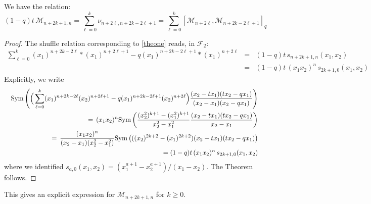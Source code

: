 \begin{thm}\label{oddMthm}
We have the relation:
\begin{equation}\label{theone}
(1-q)t \,{\mathcal M}_{n+2k+1,n}= \sum_{\ell=0}^k \nu_{n+2\ell,n+2k-2\ell+1}
=\sum_{\ell=0}^k \left[ {\mathcal M}_{n+2\ell},{\mathcal M}_{n+2k-2\ell+1}\right]_q 
\end{equation}
\end{thm}
\begin{proof}
The shuffle relation corresponding to \eqref{theone} reads, in ${\mathcal F}_2$:
\begin{eqnarray*}
\sum_{\ell=0}^k (x_1)^{n+2k-2\ell} * (x_1)^{n+2\ell+1}-q (x_1)^{n+2k-2\ell+1} * (x_1)^{n+2\ell}
&=&(1-q)t \,s_{n+2k+1,n}(x_1,x_2)\\
&=&(1-q)t\,  (x_1x_2)^n\, s_{2k+1,0}(x_1,x_2)
\end{eqnarray*}
Explicitly, we write
\begin{eqnarray*}
&&{\rm Sym}\left( \Big(\sum_{\ell=0}^k (x_1)^{n+2k-2\ell} (x_2)^{n+2\ell+1}-q (x_1)^{n+2k-2\ell+1} (x_2)^{n+2\ell}\Big)\frac{(x_2-t x_1)(t x_2-q x_1)}{(x_2-x_1)(x_2-q x_1)}\right) \\
&&\qquad =\, 
(x_1x_2)^n {\rm Sym}\left(\frac{(x_2^2)^{k+1}-(x_1^2)^{k+1}}{x_2^2-x_1^2} 
\frac{(x_2-t x_1)(t x_2-q  x_1)}{x_2-x_1}\right)\\
&&\qquad =\,\frac{(x_1x_2)^n}{(x_2-x_1)(x_2^2-x_1^2)} 
{\rm Sym}\left(((x_2)^{2k+2}-(x_1)^{2k+2})(x_2-t x_1)(t x_2-q  x_1)\right)\\
&&\qquad =(1-q)t \, (x_1x_2)^n\, s_{2k+1,0}(x_1,x_2)
\end{eqnarray*}
where we identified $s_{a,0}(x_1,x_2)=(x_1^{a+1}-x_2^{a+1})/(x_1-x_2)$.
The Theorem follows.
\end{proof}

This gives an explicit expression for ${\mathcal M}_{n+2k+1,n}$ for $k\geq 0$.

